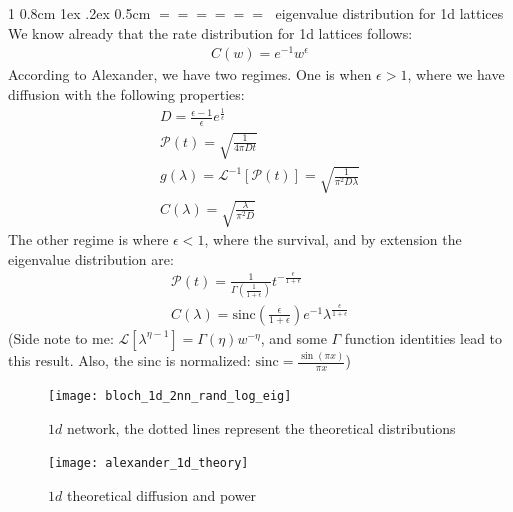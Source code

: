 \documentclass[onecolumn,fleqn,notitlepage,secnumarabic]{revtex4}
\makeatletter
\newcommand{\sinc}{\mbox{sinc}}
\def\section{%
  \@startsection
    {section}%
    {1}%
    {\z@}%
    {0.8cm \@plus1ex \@minus .2ex}%
    {0.5cm}%
    {\Large\bf $=\!=\!=\!=\!=\!=\;$}%
}%
\makeatother
\begin{document}
\section{eigenvalue distribution for 1d lattices}
We know already that the rate distribution for 1d lattices follows:
\begin{align}
C(w) = e^{-1}w^{\epsilon}
\end{align}
According to Alexander, we have two regimes. One is when $\epsilon > 1$, where we have diffusion with the following properties:
\begin{align}
D = \frac{\epsilon-1}{\epsilon}e^{\frac{1}{\epsilon}} \\
\mathcal{P}(t) = \sqrt{\frac{1}{4\pi D t}} \\
g(\lambda) = \mathcal{L}^{-1}[\mathcal{P}(t)] = \sqrt{\frac{1}{\pi^2 D \lambda}} \\ 
C(\lambda) = \sqrt{\frac{\lambda}{\pi^2 D}}
\end{align}
The other regime is where $\epsilon <1 $, where the survival, and by extension the eigenvalue distribution are:
\begin{align}
  \mathcal{P}(t) = \frac{1}{\Gamma\left(\frac{1}{1+\epsilon}\right)}t^{-\frac{\epsilon}{1+\epsilon}} \\
  C(\lambda) = \sinc\left(\frac{\epsilon}{1+\epsilon}\right)e^{-1}\lambda^{\frac{\epsilon}{1+\epsilon}}
\end{align}
(Side note to me: $\mathcal{L}[\lambda^{\eta-1}] = \Gamma(\eta)w^{-\eta}$, and some $\Gamma$ function identities lead to this result. Also, the sinc is normalized: $\sinc=\frac{\sin(\pi x)}{\pi x}$)
\begin{figure}[H]
\texttt{[image: bloch\_1d\_2nn\_rand\_log\_eig]}
\caption{$1d$ network, the dotted lines represent the theoretical distributions}
\end{figure}

\begin{figure}[H]
\texttt{[image: alexander\_1d\_theory]}
\caption{$1d$ theoretical diffusion and power}
\end{figure}

\end{document}
